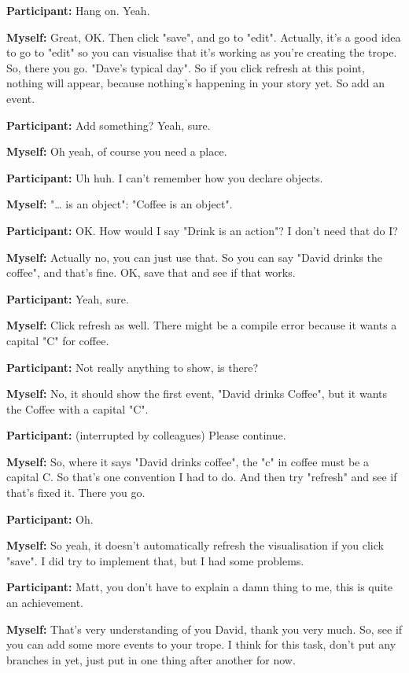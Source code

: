 \documentclass[11pt]{report}
\newcommand{\llabel}[1]{\hypertarget{llineno:#1}{\linelabel{#1}}}
\begin{document}
\begin{linenumbers}
\textbf{Participant:} Hang on. Yeah.

\textbf{Myself:} Great, OK. Then click "save", and go to "edit". Actually, it's a good idea to go to "edit" so you can visualise that it's working as you're creating the trope. So, there you go. "Dave's typical day". So if you click refresh at this point, nothing will appear, because nothing's happening in your story yet. So add an event.

\textbf{Participant:} Add something? Yeah, sure.

\textbf{Myself:} Oh yeah, of course you need a place.

\textbf{Participant:} Uh huh. I can't remember how you declare objects.

\textbf{Myself:} "\ldots{} is an object": "Coffee is an object".

\textbf{Participant:} OK. How would I say "Drink is an action"? I don't need
that do I?\llabel{lne:syntax2b}

\textbf{Myself:} Actually no, you can just use that. So you can say "David drinks the coffee", and that's fine. OK, save that and see if that works.

\textbf{Participant:} Yeah, sure.

\textbf{Myself:} Click refresh as well. There might be a compile error because it wants a capital "C" for coffee.

\textbf{Participant:} Not really anything to show, is there?

\textbf{Myself:} No, it should show the first event, "David drinks Coffee", but it wants the Coffee with a capital "C".\llabel{lne:syntax5b2}

\textbf{Participant:} (interrupted by colleagues) Please continue.

\textbf{Myself:} So, where it says "David drinks coffee", the "c" in coffee must be a capital C. So that's one convention I had to do. And then try "refresh" and see if that's fixed it. There you go.

\textbf{Participant:} Oh.

\textbf{Myself:} So yeah, it doesn't automatically refresh the visualisation if you click "save". I did try to implement that, but I had some problems.

\textbf{Participant:} Matt, you don't have to explain a damn thing to me, this is quite an achievement.

\textbf{Myself:} That's very understanding of you David, thank you very much. So, see if you can add some more events to your trope. I think for this task, don't put any branches in yet, just put in one thing after another for now.


\end{linenumbers}
\end{document}
